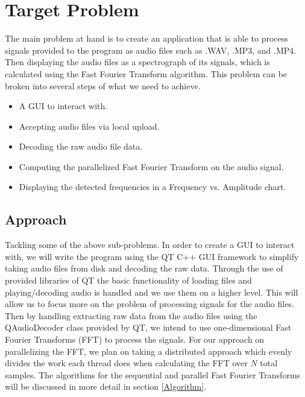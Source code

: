 \documentclass[journal]{IEEEtran}
\begin{document}
\section{Target Problem}
	\par {The main problem at hand is to create an application that is able to process signals 
	provided to the program as audio files such as .WAV, .MP3, and .MP4. Then displaying the audio 
	files as a spectrograph of its signals, which is calculated using the Fast Fourier Transform
	algorithm. This problem can be broken into several steps of 
	what we need to achieve.}

\begin{itemize}
	\item A GUI to interact with.
	\item Accepting audio files via local upload.
	\item Decoding the raw audio file data.
	\item Computing the parallelized Fast Fourier Transform on the audio signal.
	\item Displaying the detected frequencies in a Frequency vs. Amplitude chart.
\end{itemize}

\subsection{Approach}\label{Approach}
	\par {Tackling some of the above sub-problems. In order to create a GUI to interact with, 
	we will write the program using the QT C++ GUI framework to simplify taking audio files 
	from disk and decoding the raw data. Through the use of provided libraries of QT the 
	basic functionality of loading files and playing/decoding audio is handled and we use 
	them on a higher level. This will allow us to focus more on the problem of processing 
	signals for the audio files. Then by handling extracting raw data from the audio files 
	using the QAudioDecoder class provided by QT, we intend to use one-dimensional Fast 
	Fourier Transforms (FFT) to process the signals. For our approach on parallelizing the FFT,
	we plan on taking a distributed approach which evenly divides the work each thread does
	when calculating the FFT over $N$ total samples. The algorithms for the sequential and parallel 
	Fast Fourier Transforms will be discussed in more detail in section \ref{Algorithm}.
	}
\end{document}
